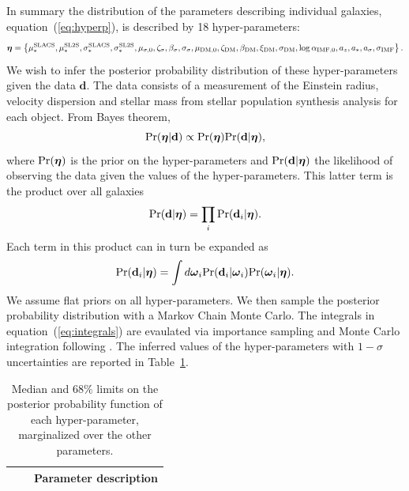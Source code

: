 \documentclass[usenatbib]{mnras}
\newcommand{\boldsymbol}[1]{\mbox{\boldmath{${#1}$}}}
\def\pr{{\rm Pr}}
\def\hyperp{\boldsymbol{\eta}}
\def\indpari{\boldsymbol{\omega}_i}
\def\datad{\mathbf{d}}
\def\datadi{\mathbf{d}_i}
\def\Tref#1{Table~\ref{#1}\xspace}
\def\Eref#1{equation~(\ref{#1})\xspace}
\begin{document}
In summary the distribution of the parameters describing individual galaxies, \Eref{eq:hyperp}, is described by 18 hyper-parameters:
\begin{equation}
\hyperp = \left\{\mu_*^{\mathrm{SLACS}}, \mu_*^{\mathrm{SL2S}}, \sigma_*^{\mathrm{SLACS}}, \sigma_*^{\mathrm{SL2S}}, \mu_{\sigma,0}, \zeta_\sigma, \beta_\sigma, \sigma_\sigma, \mu_{\mathrm{DM}, 0}, \zeta_{\mathrm{DM}}, \beta_{\mathrm{DM}}, \xi_{\mathrm{DM}}, \sigma_{\mathrm{DM}}, \log{\alpha_{\mathrm{IMF}, 0}}, a_z, a_*, a_\sigma, \sigma_{\mathrm{IMF}} \right\}.
\end{equation}
We wish to infer the posterior probability distribution of these hyper-parameters given the data $\datad$.
The data consists of a measurement of the Einstein radius, velocity dispersion and stellar mass from stellar population synthesis analysis for each object.
From Bayes theorem, 
\begin{equation}
\pr(\hyperp|\datad) \propto \pr(\hyperp)\pr(\datad|\hyperp),
\end{equation}
where $\pr(\hyperp)$ is the prior on the hyper-parameters and $\pr(\datad|\hyperp)$ the likelihood of observing the data given the values of the hyper-parameters.
This latter term is the product over all galaxies
\begin{equation}
\pr(\datad|\hyperp) = \prod_i \pr(\datadi|\hyperp).
\end{equation}
Each term in this product can in turn be expanded as
\begin{equation}\label{eq:integrals}
\pr(\datadi|\hyperp) = \int d\indpari \pr(\datadi|\indpari) \pr(\indpari|\hyperp).
\end{equation}
We assume flat priors on all hyper-parameters.
We then sample the posterior probability distribution with a Markov Chain Monte Carlo. 
The integrals in \Eref{eq:integrals} are evaulated via importance sampling and Monte Carlo integration following \citet{Sch++15}.
The inferred values of the hyper-parameters with $1-\sigma$ uncertainties are reported in \Tref{tab:hyperp}.
\begin{table}
 \caption{Median and $68\%$ limits on the posterior probability function of each hyper-parameter, marginalized over the other parameters.}
 \label{tab:hyperp}
 \begin{tabular}{lcl}
 \hline
 & & Parameter description \\
 \hline
 
 \hline
 \end{tabular}
\end{table}
\end{document}
